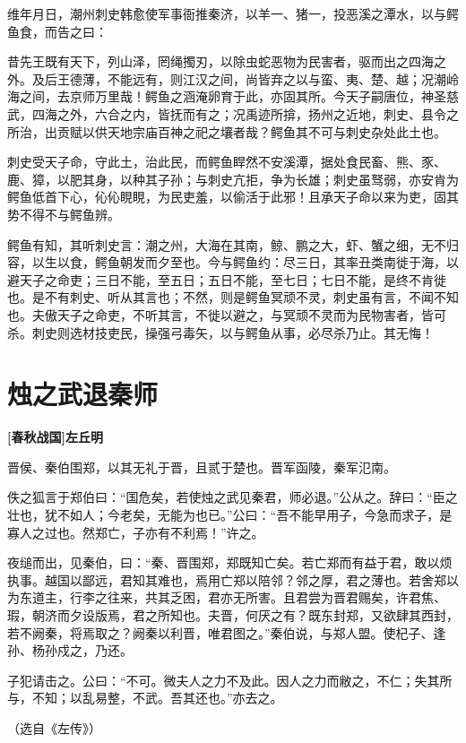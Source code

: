 \documentclass[UTF8,titlepage,oneside]{ctexbook}
\begin{document}
维年月日，潮州刺史韩愈使军事衙推秦济，以羊一、猪一，投恶溪之潭水，以与鳄鱼食，而告之曰：

昔先王既有天下，列山泽，罔绳擉刃，以除虫蛇恶物为民害者，驱而出之四海之外。及后王德薄，不能远有，则江汉之间，尚皆弃之以与蛮、夷、楚、越；况潮岭海之间，去京师万里哉！鳄鱼之涵淹卵育于此，亦固其所。今天子嗣唐位，神圣慈武，四海之外，六合之内，皆抚而有之；况禹迹所揜，扬州之近地，刺史、县令之所治，出贡赋以供天地宗庙百神之祀之壤者哉？鳄鱼其不可与刺史杂处此土也。

刺史受天子命，守此土，治此民，而鳄鱼睅然不安溪潭，据处食民畜、熊、豕、鹿、獐，以肥其身，以种其子孙；与刺史亢拒，争为长雄；刺史虽驽弱，亦安肯为鳄鱼低首下心，伈伈睍睍，为民吏羞，以偷活于此邪！且承天子命以来为吏，固其势不得不与鳄鱼辨。

鳄鱼有知，其听刺史言：潮之州，大海在其南，鲸、鹏之大，虾、蟹之细，无不归容，以生以食，鳄鱼朝发而夕至也。今与鳄鱼约：尽三日，其率丑类南徙于海，以避天子之命吏；三日不能，至五日；五日不能，至七日；七日不能，是终不肯徙也。是不有刺史、听从其言也；不然，则是鳄鱼冥顽不灵，刺史虽有言，不闻不知也。夫傲天子之命吏，不听其言，不徙以避之，与冥顽不灵而为民物害者，皆可杀。刺史则选材技吏民，操强弓毒矢，以与鳄鱼从事，必尽杀乃止。其无悔！


\chapter*{烛之武退秦师}
\begin{center}
	\textbf{[春秋战国]左丘明}
\end{center}


晋侯、秦伯围郑，以其无礼于晋，且贰于楚也。晋军函陵，秦军氾南。


佚之狐言于郑伯曰：“国危矣，若使烛之武见秦君，师必退。”公从之。辞曰：“臣之壮也，犹不如人；今老矣，无能为也已。”公曰：“吾不能早用子，今急而求子，是寡人之过也。然郑亡，子亦有不利焉！”许之。


夜缒而出，见秦伯，曰：“秦、晋围郑，郑既知亡矣。若亡郑而有益于君，敢以烦执事。越国以鄙远，君知其难也，焉用亡郑以陪邻？邻之厚，君之薄也。若舍郑以为东道主，行李之往来，共其乏困，君亦无所害。且君尝为晋君赐矣，许君焦、瑕，朝济而夕设版焉，君之所知也。夫晋，何厌之有？既东封郑，又欲肆其西封，若不阙秦，将焉取之？阙秦以利晋，唯君图之。”秦伯说，与郑人盟。使杞子、逢孙、杨孙戍之，乃还。


子犯请击之。公曰：“不可。微夫人之力不及此。因人之力而敝之，不仁；失其所与，不知；以乱易整，不武。吾其还也。”亦去之。


（选自《左传》）
\end{document}
